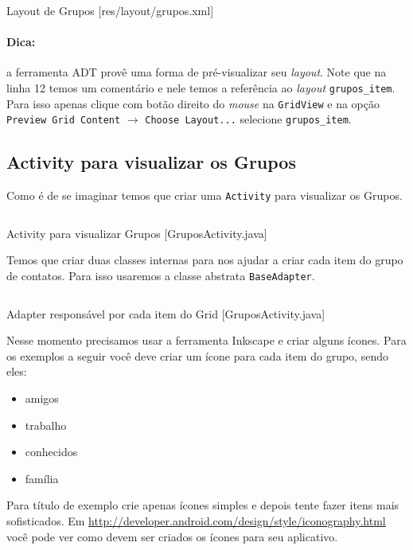 \begin{listing}[H]
  \inputminted[linenos=true,frame=bottomline,tabsize=3]{ xml }{ source/grupos-1.xml }
  \caption{Layout de Grupos [res/layout/grupos.xml]}
\end{listing}

\paragraph{Dica:}

a ferramenta ADT provê uma forma de pré-visualizar seu \emph{layout}.
Note que na linha 12 temos um comentário e nele temos a referência ao
\emph{layout} \texttt{grupos\_item}. Para isso apenas clique com botão
direito do \emph{mouse} na \texttt{GridView} e na opção
\texttt{Preview Grid Content} $\rightarrow$ \texttt{Choose Layout...}
selecione \texttt{grupos\_item}.

\subsection{Activity para visualizar os Grupos}

Como é de se imaginar temos que criar uma \texttt{Activity} para
visualizar os Grupos.

\begin{listing}[H]
  \inputminted[linenos=true,frame=bottomline,tabsize=3]{ java }{ source/GruposActivity-1.java }
  \caption{Activity para visualizar Grupos [GruposActivity.java]}
\end{listing}

Temos que criar duas classes internas para nos ajudar a criar cada item
do grupo de contatos. Para isso usaremos a classe abstrata
\texttt{BaseAdapter}.

\begin{listing}[H]
  \inputminted[linenos=true,frame=bottomline,tabsize=3]{ java }{ source/GruposActivity-2.java }
  \caption{Adapter responsável por cada item do Grid [GruposActivity.java]}
\end{listing}

Nesse momento precisamos usar a ferramenta Inkscape e criar alguns
ícones. Para os exemplos a seguir você deve criar um ícone para cada
item do grupo, sendo eles:

\begin{itemize}
\item
  amigos
\item
  trabalho
\item
  conhecidos
\item
  família
\end{itemize}
Para título de exemplo crie apenas ícones simples e depois tente fazer
itens mais sofisticados. Em
\url{http://developer.android.com/design/style/iconography.html} você
pode ver como devem ser criados os ícones para seu aplicativo.

